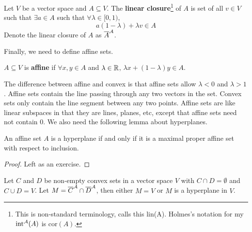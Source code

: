 \begin{definition}
  Let $V$ be a vector space and $A \subseteq V$. The \textbf{linear
    closure}\footnote{This is non-standard terminology,
    \cite{holmes1975} calls this lin(A). Holmes's notation for my
    ${\mathrm{int}}^{\mathcal{A}}({A})$ is $\mathrm{cor}(A)$.} of $A$ is set
  of all $v \in V$ such that $\exists a \in A$ such that
  $\forall \lambda \in [0,1)$,
  \[ a(1-\lambda) + \lambda v \in A \]
  Denote the linear closure of $A$ as ${\overline{{A}}}^\mathcal{A}$.
\end{definition}
Finally, we need to define affine sets.
\begin{definition}
  $A \subseteq V$ is \textbf{affine} if $\forall x, y \in A$ and $\lambda \in
  \mathbb{R}$, $\lambda x + (1-\lambda)y \in A$.
\end{definition}
The difference between affine and convex is that affine sets allow
$\lambda <0$ and $\lambda >1$. Affine sets contain the line passing
through any two vectors in the set. Convex sets only contain the line
segment between any two points. Affine sets are like linear subspaces
in that they are lines, planes, etc, except that affine sets need not
contain $0$.  We also need the following lemma about hyperplanes.
\begin{lemma}
  An affine set $A$ is a hyperplane if and only if it is a maximal
  proper affine set with respect to inclusion.
\end{lemma}
\begin{proof}
  Left as an exercise.
\end{proof}
\begin{lemma}\label{lem:compconvex}
  Let $C$ and $D$ be non-empty convex sets in a vector space
  $V$ with $C \cap D = \emptyset$ and $C \cup D = V$. Let
  $M = {\overline{{C}}}^\mathcal{A} \cap {\overline{{D}}}^\mathcal{A}$, then either $M = V$ or $M$ is
  a hyperplane in $V$.
\end{lemma}
